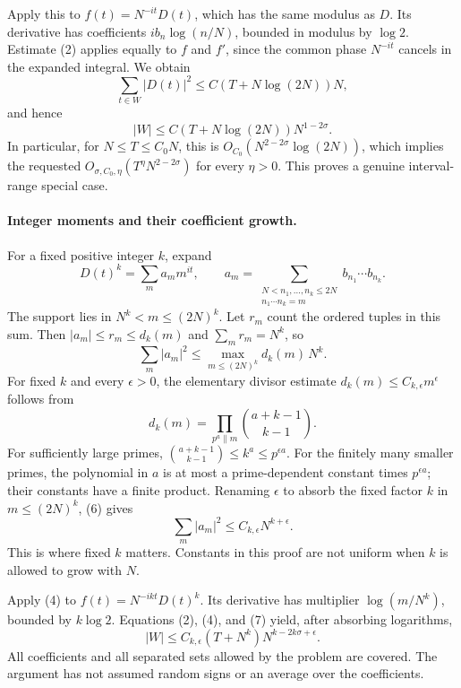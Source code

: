 \documentclass[11pt]{article}
\begin{document}
Apply this to $f(t)=N^{-it}D(t)$, which has the same modulus as $D$.
Its derivative has coefficients $i b_n\log(n/N)$, bounded in modulus
by $\log2$. Estimate (2) applies equally to $f$ and $f'$, since
the common phase $N^{-it}$ cancels in the expanded integral.
We obtain
\[
         \sum_{t\in W}|D(t)|^2\le C(T+N\log(2N))N,
\]
and hence
\[
              |W|\le C(T+N\log(2N))N^{1-2\sigma}.       \tag{5}
\]
In particular, for $N\le T\le C_0N$, this is
$O_{C_0}(N^{2-2\sigma}\log(2N))$, which implies the requested
$O_{\sigma,C_0,\eta}(T^\eta N^{2-2\sigma})$ for every $\eta>0$.
This proves a genuine interval-range special case.

\paragraph{Integer moments and their coefficient growth.}
For a fixed positive integer $k$, expand
\[
 D(t)^k=\sum_m a_m m^{it},\qquad
 a_m=\sum_{\substack{N<n_1,\ldots,n_k\le2N\\n_1\cdots n_k=m}}
                                      b_{n_1}\cdots b_{n_k}.
\]
The support lies in $N^k<m\le(2N)^k$.
Let $r_m$ count the ordered tuples in this sum. Then
$|a_m|\le r_m\le d_k(m)$ and $\sum_mr_m=N^k$, so
\[
                 \sum_m|a_m|^2\le\max_{m\le(2N)^k}d_k(m)\,N^k.
                                                               \tag{6}
\]
For fixed $k$ and every $\epsilon>0$, the elementary divisor estimate
$d_k(m)\le C_{k,\epsilon}m^\epsilon$ follows from
\[
                 d_k(m)=\prod_{p^a\parallel m}\binom{a+k-1}{k-1}.
\]
For sufficiently large primes, $\binom{a+k-1}{k-1}\le k^a\le p^{\epsilon a}$.
For the finitely many smaller primes, the polynomial in $a$ is at most
a prime-dependent constant times $p^{\epsilon a}$; their constants
have a finite product. Renaming $\epsilon$ to absorb the fixed factor
$k$ in $m\le(2N)^k$, (6) gives
\[
                      \sum_m|a_m|^2\le C_{k,\epsilon}N^{k+\epsilon}.
                                                               \tag{7}
\]
This is where fixed $k$ matters. Constants in this proof are not
uniform when $k$ is allowed to grow with $N$.

Apply (4) to $f(t)=N^{-ikt}D(t)^k$.
Its derivative has multiplier $\log(m/N^k)$, bounded by $k\log2$.
Equations (2), (4), and (7) yield, after absorbing logarithms,
\[
        |W|\le C_{k,\epsilon}
                 (T+N^k)N^{k-2k\sigma+\epsilon}.        \tag{8}
\]
All coefficients and all separated sets allowed by the problem are
covered. The argument has not assumed random signs or an average over
the coefficients.
\end{document}
